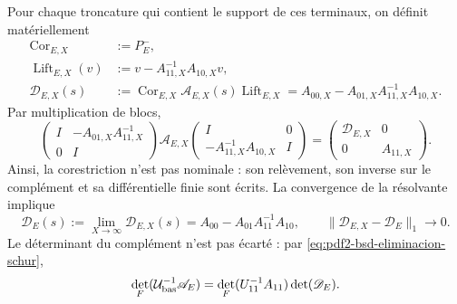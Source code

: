 Pour chaque troncature qui contient le support de ces terminaux, on définit
matériellement
\begin{equation}\label{eq:pdf2-bsd-cor-lift-truncados}
 \begin{aligned}
  \operatorname{Cor}_{E,X}&:=P_E^-,\\
  \operatorname{Lift}_{E,X}(v)&:=
       v-A_{11,X}^{-1}A_{10,X}v,\\
  \mathscr D_{E,X}(s)&:=
       \operatorname{Cor}_{E,X}\mathscr A_{E,X}(s)
       \operatorname{Lift}_{E,X}
       =A_{00,X}-A_{01,X}A_{11,X}^{-1}A_{10,X}.
 \end{aligned}
\end{equation}
Par multiplication de blocs,
\begin{equation}\label{eq:pdf2-bsd-eliminacion-schur}
 \begin{pmatrix}I&-A_{01,X}A_{11,X}^{-1}\\0&I\end{pmatrix}
 \mathscr A_{E,X}
 \begin{pmatrix}I&0\\-A_{11,X}^{-1}A_{10,X}&I\end{pmatrix}
 =\begin{pmatrix}\mathscr D_{E,X}&0\\0&A_{11,X}\end{pmatrix}.
\end{equation}
Ainsi, la corestriction n'est pas nominale : son relèvement, son inverse sur le complément
et sa différentielle finie sont écrits. La convergence de la résolvante
implique
\begin{equation}\label{eq:pdf2-bsd-corestriccion-limite}
 \mathscr D_E(s):=\lim_{X\to\infty}\mathscr D_{E,X}(s)
 =A_{00}-A_{01}A_{11}^{-1}A_{10},
 \qquad
 \|\mathscr D_{E,X}-\mathscr D_E\|_1\to0.
\end{equation}
Le déterminant du complément n'est pas écarté : par
\eqref{eq:pdf2-bsd-eliminacion-schur},
\begin{equation}\label{eq:pdf2-bsd-determinante-schur-complemento}
 \det_F(\mathcal U_{\rm bas}^{-1}\mathscr A_E)
 =\det_F(U_{11}^{-1}A_{11})\det(\mathscr D_E).
\end{equation}

